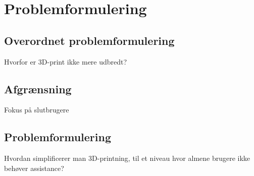 \chapter{Problemformulering} %
\label{cha:problemformulering}

\section{Overordnet problemformulering} %

Hvorfor er 3D-print ikke mere udbredt?


\section{Afgrænsning} %

Fokus på slutbrugere

\section{Problemformulering} %

Hvordan simplificerer man 3D-printning, til et niveau hvor almene brugere ikke behøver assistance?

